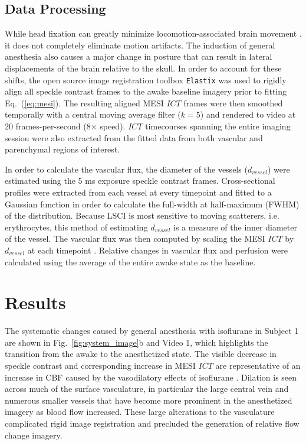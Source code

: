 \documentclass[12pt]{spieman}
\begin{document}
\begin{spacing}{2}

\subsection{Data Processing}

While head fixation can greatly minimize locomotion-associated brain movement \cite{Dombeck:2007gr}, it does not completely eliminate motion artifacts. The induction of general anesthesia also causes a major change in posture that can result in lateral displacements of the brain relative to the skull. In order to account for these shifts, the open source image registration toolbox \texttt{Elastix} \cite{Klein:2010gr} was used to rigidly align all speckle contrast frames to the awake baseline imagery prior to fitting Eq.~(\ref{eq:mesi}). The resulting aligned MESI $ICT$ frames were then smoothed temporally with a central moving average filter ($k=5$) and rendered to video at 20 frames-per-second (8$\times$ speed). $ICT$ timecourses spanning the entire imaging session were also extracted from the fitted data from both vascular and parenchymal regions of interest.

In order to calculate the vascular flux, the diameter of the vessels ($d_{vessel}$) were estimated using the 5 ms exposure speckle contrast frames. Cross-sectional profiles were extracted from each vessel at every timepoint and fitted to a Gaussian function in order to calculate the full-width at half-maximum (FWHM) of the distribution. Because LSCI is most sensitive to moving scatterers, i.e. erythrocytes, this method of estimating $d_{vessel}$ is a measure of the inner diameter of the vessel. The vascular flux was then computed by scaling the MESI $ICT$ by $d_{vessel}$ at each timepoint \cite{Kazmi:2015du}. Relative changes in vascular flux and perfusion were calculated using the average of the entire awake state as the baseline.


\section{Results}
\label{sect:results}

The systematic changes caused by general anesthesia with isoflurane in Subject 1 are shown in Fig.~\ref{fig:system_image}b and Video 1, which highlights the transition from the awake to the anesthetized state. The visible decrease in speckle contrast and corresponding increase in MESI $ICT$ are representative of an increase in CBF caused by the vasodilatory effects of isoflurane \cite{Masamoto:2012bj}. Dilation is seen across much of the surface vasculature, in particular the large central vein and numerous smaller vessels that have become more prominent in the anesthetized imagery as blood flow increased. These large alterations to the vasculature complicated rigid image registration and precluded the generation of relative flow change imagery.


\end{spacing}
\end{document}
